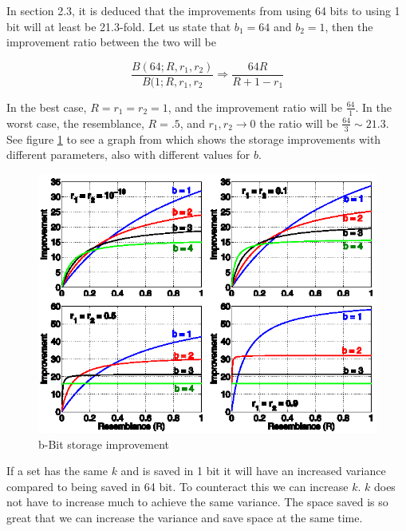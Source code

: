 \documentclass[a4paper,11pt]{article}
\begin{document}
In \cite{article:bbit} section 2.3, it is deduced that the improvements from using 64 bits to using 1 bit will at least be 21.3-fold. Let us state that $b_1 = 64$ and $b_2 = 1$, then the improvement ratio between the two will be

\begin{equation}
    \frac{B(64;R,r_1,r_2)}{B(1;R,r_1,r_2} \Rightarrow \frac{64 R}{R + 1 - r_1}
    \label{eq:improvementratio}
\end{equation}

In the best case, $R = r_1 = r_2 = 1$, and the improvement ratio will be $\frac{64}{1}$. In the worst case, the resemblance, $R=.5$, and $r_1, r_2 \rightarrow 0$ the ratio will be $\frac{64}{3} \sim 21.3$. See figure \ref{fig:bbit} to see a graph from \cite{article:bbit} which shows the storage improvements with different parameters, also with different values for $b$. \\


\begin{figure}[H]
    \begin{center}
        \includegraphics{plots/bbit/bbit.eps}
        \caption{b-Bit storage improvement}
        \label{fig:bbit}
    \end{center}
\end{figure}

If a set has the same $k$ and is saved in 1 bit it will have an increased variance compared to being saved in 64 bit. To counteract this we can increase $k$. $k$ does not have to increase much to achieve the same variance\cite{article:bbit2}. The space saved is so great that we can increase the variance and save space at the same time.
\end{document}
